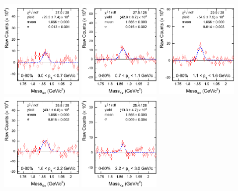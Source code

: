 \bfg \centering
\includegraphics[width=0.3\textwidth]{figure/Run11_YF/D0_0-80_1_7_signal.png}
\includegraphics[width=0.3\textwidth]{figure/Run11_YF/D0_0-80_8_11_signal.png}
\includegraphics[width=0.3\textwidth]{figure/Run11_YF/D0_0-80_12_16_signal.png}
\includegraphics[width=0.3\textwidth]{figure/Run11_YF/D0_0-80_17_22_signal.png}
\includegraphics[width=0.3\textwidth]{figure/Run11_YF/D0_0-80_23_30_signal.png}
